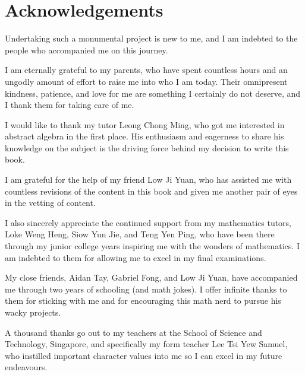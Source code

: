 \vspace*{\fill}

\begin{center}
    \fontsize{8pt}{8pt}\selectfont
\end{center}

\newpage

\createtoc

\chapter{Acknowledgements}
Undertaking such a monumental project is new to me, and I am indebted to the people who accompanied me on this journey.

I am eternally grateful to my parents, who have spent countless hours and an ungodly amount of effort to raise me into who I am today. Their omnipresent kindness, patience, and love for me are something I certainly do not deserve, and I thank them for taking care of me.

I would like to thank my tutor Leong Chong Ming, who got me interested in abstract algebra in the first place. His enthusiasm and eagerness to share his knowledge on the subject is the driving force behind my decision to write this book.

I am grateful for the help of my friend Low Ji Yuan, who has assisted me with countless revisions of the content in this book and given me another pair of eyes in the vetting of content.

I also sincerely appreciate the continued support from my mathematics tutors, Loke Weng Heng, Siow Yun Jie, and Teng Yen Ping, who have been there through my junior college years inspiring me with the wonders of mathematics. I am indebted to them for allowing me to excel in my final examinations.

My close friends, Aidan Tay, Gabriel Fong, and Low Ji Yuan, have accompanied me through two years of schooling (and math jokes). I offer infinite thanks to them for sticking with me and for encouraging this math nerd to pursue his wacky projects.

A thousand thanks go out to my teachers at the School of Science and Technology, Singapore, and specifically my form teacher Lee Tsi Yew Samuel, who instilled important character values into me so I can excel in my future endeavours.

